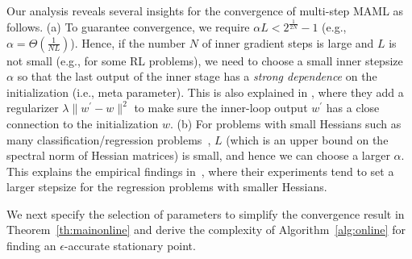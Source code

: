 \documentclass{osudissert96}
\begin{document}
Our analysis reveals several insights for the convergence of multi-step MAML as follows.
(a) To guarantee convergence, we require $\alpha L< 2^{\frac{1}{2N}} - 1$ (e.g., $\alpha=\Theta(\frac{1}{NL})$). Hence, if the number $N$ of inner gradient steps is large and $L$ is not small (e.g., for some RL problems), we need to choose a small inner stepsize  $\alpha$ so that  the last output of the inner stage has a {\em strong dependence} on the initialization (i.e., meta parameter). This is also explained in  \cite{rajeswaran2019meta}, where they add a regularizer $\lambda\|w^\prime-w\|^2$ to make sure the inner-loop output $w^\prime$ has a close connection to the initialization $w$. (b) For problems with small Hessians such as many classification/regression problems~\cite{finn2017model}, $L$ (which is an upper bound on the spectral norm of Hessian matrices) is small, and hence we can choose a larger $\alpha$. This explains the empirical findings in~\cite{finn2017model,antoniou2019train}, where their experiments tend to set a larger stepsize for the regression problems with smaller Hessians. 

We next specify the selection of parameters  to simplify the convergence result in Theorem~\ref{th:mainonline} and derive the  complexity of Algorithm~\ref{alg:online} for finding an $\epsilon$-accurate  stationary point. %
\end{document}
